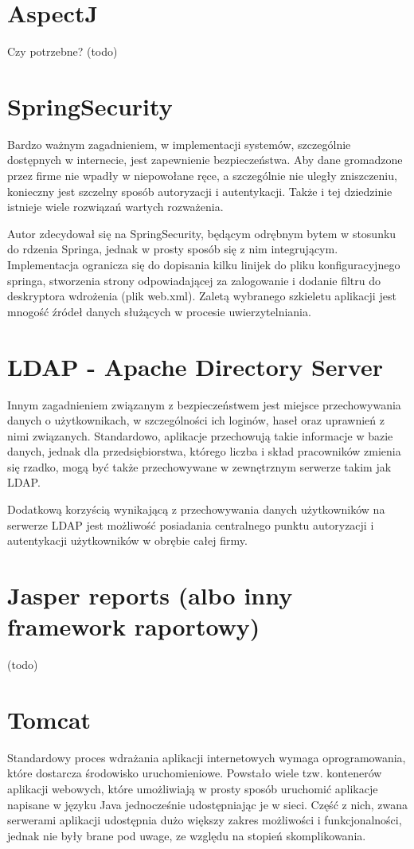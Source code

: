 \newpage
\section{AspectJ}
Czy potrzebne? (todo)

\section{SpringSecurity}
Bardzo ważnym zagadnieniem, w implementacji systemów, szczególnie dostępnych w internecie, jest zapewnienie bezpieczeństwa. Aby dane gromadzone przez firme nie wpadły w niepowołane ręce, a szczególnie nie uległy zniszczeniu, konieczny jest szczelny sposób autoryzacji i autentykacji. Także i tej dziedzinie istnieje wiele rozwiązań wartych rozważenia.

Autor zdecydował się na SpringSecurity, będącym odrębnym bytem w stosunku do rdzenia Springa, jednak w prosty sposób się z nim integrującym. Implementacja ogranicza się do dopisania kilku linijek do pliku konfiguracyjnego springa, stworzenia strony odpowiadającej za zalogowanie i dodanie filtru do deskryptora wdrożenia (plik web.xml). Zaletą wybranego szkieletu aplikacji jest mnogość źródeł danych służących w procesie uwierzytelniania.

\section{LDAP - Apache Directory Server}
Innym zagadnieniem związanym z bezpieczeństwem jest miejsce przechowywania danych o użytkownikach, w szczególności ich loginów, haseł oraz uprawnień z nimi związanych. Standardowo, aplikacje przechowują takie informacje w bazie danych, jednak dla przedsiębiorstwa, którego liczba i skład pracowników zmienia się rzadko, mogą być także przechowywane w zewnętrznym serwerze takim jak LDAP.

Dodatkową korzyścią wynikającą z przechowywania danych użytkowników na serwerze LDAP jest możliwość posiadania centralnego punktu autoryzacji i autentykacji użytkowników w obrębie całej firmy. 

\section{Jasper reports (albo inny framework raportowy)}
(todo)

\newpage
\section{Tomcat}
Standardowy proces wdrażania aplikacji internetowych wymaga oprogramowania, które dostarcza środowisko uruchomieniowe. Powstało wiele tzw. kontenerów aplikacji webowych, które umożliwiają w prosty sposób uruchomić aplikacje napisane w języku Java jednocześnie udostępniając je w sieci. Część z nich, zwana serwerami aplikacji udostępnia dużo większy zakres możliwości i funkcjonalności, jednak nie były brane pod uwage, ze względu na stopień skomplikowania. 

